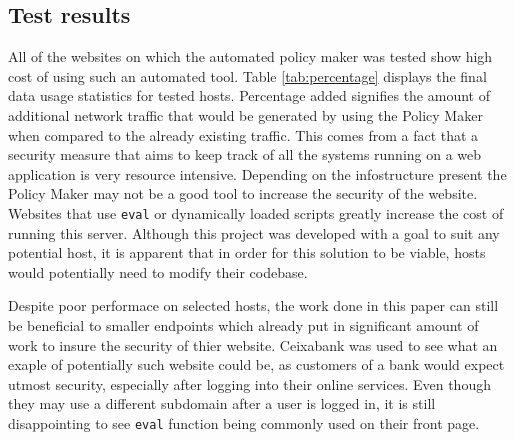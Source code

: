 \begin{description}
\subsection{Test results}

All of the websites on which the automated policy maker was tested show high cost of using such an automated tool.
Table \ref{tab:percentage} displays the final data usage statistics for tested hosts.
Percentage added signifies the amount of additional network traffic that would be generated by using the Policy Maker when compared to the already existing traffic.
This comes from a fact that a security measure that aims to keep track of all the systems running on a web application is very resource intensive.
Depending on the infostructure present the Policy Maker may not be a good tool to increase the security of the website.
Websites that use \texttt{eval} or dynamically loaded scripts greatly increase the cost of running this server.
Although this project was developed with a goal to suit any potential host, it is apparent that in order for this solution to be viable, hosts would potentially need to modify their codebase.

Despite poor performace on selected hosts, the work done in this paper can still be beneficial to smaller endpoints which already put in significant amount of work to insure the security of thier website.
Ceixabank was used to see what an exaple of potentially such website could be, as customers of a bank would expect utmost security, especially after logging into their online services.
Even though they may use a different subdomain after a user is logged in, it is still disappointing to see \texttt{eval} function being commonly used on their front page.




\end{description}
